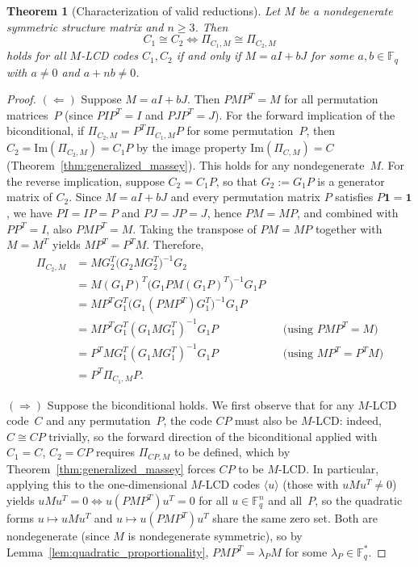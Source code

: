 \documentclass[11pt]{article}
\newcommand{\FF}{\mathbb{F}}
\newcommand{\0}{\mathbf{0}}
\newcommand{\1}{\mathbf{1}}
\theoremstyle{plain}
\newtheorem{theorem}{Theorem}[section]
\theoremstyle{definition}
\theoremstyle{remark}
\begin{document}
\begin{theorem}[Characterization of valid reductions]
\label{thm:main_characterization}
Let $M$ be a nondegenerate symmetric structure matrix and $n \geq 3$. Then
\[
C_1 \cong C_2 \iff \Pi_{C_1,M} \cong \Pi_{C_2,M}
\]
holds for all $M$-LCD codes $C_1, C_2$ if and only if $M = aI + bJ$ for some $a, b \in \FF_q$ with $a \neq 0$ and $a + nb \neq 0$.
\end{theorem}

\begin{proof}
$(\Leftarrow)$
Suppose $M = aI + bJ$. Then $PMP^T = M$ for all permutation matrices~$P$ (since $PIP^T = I$ and $PJP^T = J$). For the forward implication of the biconditional, if $\Pi_{C_2,M} = P^T\Pi_{C_1,M}P$ for some permutation~$P$, then $C_2 = \mathrm{Im}(\Pi_{C_2,M}) = C_1P$ by the image property $\mathrm{Im}(\Pi_{C,M}) = C$ (Theorem~\ref{thm:generalized_massey}). This holds for any nondegenerate~$M$. For the reverse implication, suppose $C_2 = C_1 P$, so that $G_2 := G_1 P$ is a generator matrix of $C_2$. Since $M = aI + bJ$ and every permutation matrix $P$ satisfies $P\1 = \1$, we have $PI = IP = P$ and $PJ = JP = J$, hence $PM = MP$, and combined with $PP^T = I$, also $PMP^T = M$. Taking the transpose of $PM = MP$ together with $M = M^T$ yields $MP^T = P^T M$. Therefore,
\begin{align*}
\Pi_{C_2,M}
&= M G_2^T \bigl(G_2 M G_2^T\bigr)^{-1} G_2 \\
&= M (G_1 P)^T \bigl(G_1 P M (G_1 P)^T\bigr)^{-1} G_1 P \\
&= M P^T G_1^T \bigl(G_1 (PMP^T) G_1^T\bigr)^{-1} G_1 P \\
&= M P^T G_1^T (G_1 M G_1^T)^{-1} G_1 P
   && \text{(using $PMP^T = M$)} \\
&= P^T M G_1^T (G_1 M G_1^T)^{-1} G_1 P
   && \text{(using $MP^T = P^T M$)} \\
&= P^T \Pi_{C_1,M} P.
\end{align*}

$(\Rightarrow)$
Suppose the biconditional holds. We first observe that for any $M$-LCD code~$C$ and any permutation~$P$, the code $CP$ must also be $M$-LCD: indeed, $C \cong CP$ trivially, so the forward direction of the biconditional applied with $C_1 = C$, $C_2 = CP$ requires $\Pi_{CP,M}$ to be defined, which by Theorem~\ref{thm:generalized_massey} forces $CP$ to be $M$-LCD. In particular, applying this to the one-dimensional $M$-LCD codes $\langle u \rangle$ (those with $uMu^T \neq 0$) yields $uMu^T = 0 \Leftrightarrow u(PMP^T)u^T = 0$ for all $u \in \FF_q^n$ and all~$P$, so the quadratic forms $u \mapsto uMu^T$ and $u \mapsto u(PMP^T)u^T$ share the same zero set. Both are nondegenerate (since $M$ is nondegenerate symmetric), so by Lemma~\ref{lem:quadratic_proportionality}, $PMP^T = \lambda_P M$ for some $\lambda_P \in \FF_q^*$.


\end{proof}
\end{document}
